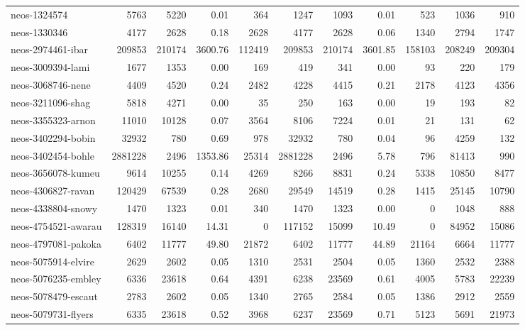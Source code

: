 \documentclass[pdflatex,sn-mathphys-num]{sn-jnl}%
\theoremstyle{thmstyleone}%
\theoremstyle{thmstylethree}%
\theoremstyle{thmstyletwo}%
\begin{document}
\begin{appendices}
{\begin{longtable}{l|r|r|r|r|r|r|r|r|r|r}
neos-1324574                   & 5763 & 5220 & 0.01 & 364 & 1247 & 1093 & 0.01 & 523 & 1036 & 910\\
neos-1330346                   & 4177 & 2628 & 0.18 & 2628 & 4177 & 2628 & 0.06 & 1340 & 2794 & 1747\\
neos-2974461-ibar              & 209853 & 210174 & 3600.76 & 112419 & 209853 & 210174 & 3601.85 & 158103 & 208249 & 209304\\
neos-3009394-lami              & 1677 & 1353 & 0.00 & 169 & 419 & 341 & 0.00 & 93 & 220 & 179\\
neos-3068746-nene              & 4409 & 4520 & 0.24 & 2482 & 4228 & 4415 & 0.21 & 2178 & 4123 & 4356\\
neos-3211096-shag              & 5818 & 4271 & 0.00 & 35 & 250 & 163 & 0.00 & 19 & 193 & 82\\
neos-3355323-arnon             & 11010 & 10128 & 0.07 & 3564 & 8106 & 7224 & 0.01 & 21 & 131 & 62\\
neos-3402294-bobin             & 32932 & 780 & 0.69 & 978 & 32932 & 780 & 0.04 & 96 & 4259 & 132\\
neos-3402454-bohle             & 2881228 & 2496 & 1353.86 & 25314 & 2881228 & 2496 & 5.78 & 796 & 81413 & 990\\
neos-3656078-kumeu             & 9614 & 10255 & 0.14 & 4269 & 8266 & 8831 & 0.24 & 5338 & 10850 & 8477\\
neos-4306827-ravan             & 120429 & 67539 & 0.28 & 2680 & 29549 & 14519 & 0.28 & 1415 & 25145 & 10790\\
neos-4338804-snowy             & 1470 & 1323 & 0.01 & 340 & 1470 & 1323 & 0.00 & 0 & 1048 & 888\\
neos-4754521-awarau            & 128319 & 16140 & 14.31 & 0 & 117152 & 15099 & 10.49 & 0 & 84952 & 15086\\
neos-4797081-pakoka            & 6402 & 11777 & 49.80 & 21872 & 6402 & 11777 & 44.89 & 21164 & 6664 & 11777\\
neos-5075914-elvire            & 2629 & 2602 & 0.05 & 1310 & 2531 & 2504 & 0.05 & 1360 & 2532 & 2388\\
neos-5076235-embley            & 6336 & 23618 & 0.64 & 4391 & 6238 & 23569 & 0.61 & 4005 & 5783 & 22239\\
neos-5078479-escaut            & 2783 & 2602 & 0.05 & 1340 & 2765 & 2584 & 0.05 & 1386 & 2912 & 2559\\
neos-5079731-flyers            & 6335 & 23618 & 0.52 & 3968 & 6237 & 23569 & 0.71 & 5123 & 5691 & 21973\\

\end{longtable}}
\end{appendices}
\end{document}
